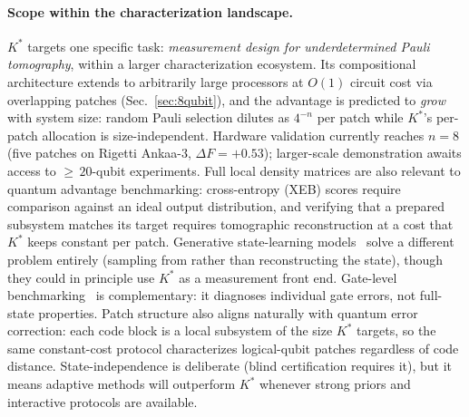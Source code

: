 \documentclass[twocolumn,prx,aps,superscriptaddress,longbibliography,floatfix]{revtex4-2}
\begin{document}
\paragraph{Scope within the characterization landscape.}
$K^*$ targets one specific task: \emph{measurement design for
underdetermined Pauli tomography}, within a larger characterization
ecosystem.
Its compositional architecture extends to arbitrarily large
processors at $O(1)$ circuit cost via overlapping patches
(Sec.~\ref{sec:8qubit}), and the advantage is predicted to
\emph{grow} with system size: random Pauli selection dilutes as
$4^{-n}$ per patch while $K^*$'s per-patch allocation is
size-independent.  Hardware validation currently reaches $n = 8$
(five patches on Rigetti Ankaa-3,
$\Delta F = +0.53$); larger-scale demonstration awaits access to
${\ge}\,20$-qubit experiments.
Full local density matrices are also relevant to quantum advantage
benchmarking: cross-entropy (XEB) scores require comparison against
an ideal output distribution, and verifying that a prepared
subsystem matches its target requires tomographic reconstruction
at a cost that $K^*$ keeps constant per patch.
Generative state-learning models~\cite{Akhound-Sadegh2024} solve
a different problem entirely (sampling from rather than
reconstructing the state), though they could in principle use $K^*$
as a measurement front end.
Gate-level benchmarking~\cite{Erhard2019} is complementary:
it diagnoses individual gate errors, not full-state properties.
Patch structure also aligns naturally with quantum error
correction: each code block is a local subsystem of the size
$K^*$ targets, so the same constant-cost protocol characterizes
logical-qubit patches regardless of code distance.
State-independence is deliberate (blind certification
requires it), but it means adaptive methods will outperform $K^*$
whenever strong priors and interactive protocols are available.
\end{document}
